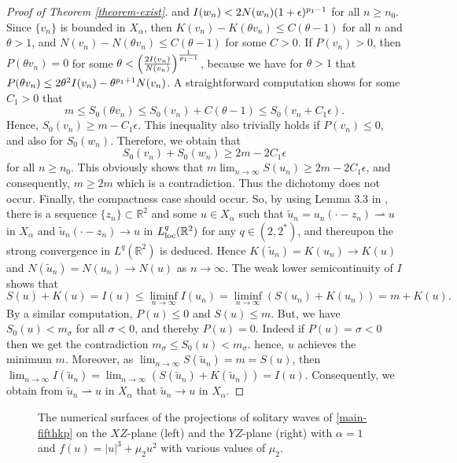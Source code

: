 \documentclass[10pt]{article}
\numberwithin{equation}{section}
\newcommand{\lam}{\lambda}
\newcommand{\al}{\alpha}
\newcommand{\rt}{{\mathbb{R}^2}}
\begin{document}
\begin{proof}[Proof of Theorem \ref{theorem-exist}]
		and $I(w_n)<2N(w_n)(1+\epsilon)^{{p_1}-1}$ for all $n\geq n_0$. Since $\{v_n\}$ is bounded in $X_\al$, then $K(v_n)-K(\theta v_n)\leq C(\theta-1)$ for all $n$ and $\theta>1$, and $N(v_n)-N(\theta v_n)\leq C(\theta-1)$ for some $C>0$. If $P(v_n)>0$, then $P(\theta v_n)=0$ for some $\theta<\left(\frac{2I(v_n)}{N(v_n)}\right)^{\frac1{{p_1}-1}}$, because we have for $\theta>1$ that $P(\theta v_n)\leq2\theta^2I(v_n)-\theta^{{p_1}+1}N(v_n)$. A straightforward computation shows for some $C_1>0$ that
		\[
		m\leq S_0(\theta v_n)
		\leq S_0(v_n)+C(\theta-1)\leq S_0(v_n+C_1\epsilon).
		\]
		Hence, $S_0(v_n)\geq m-C_1\epsilon$. This inequality also trivially holds if $P(v_n)\leq0$, and also for $S_0(w_n)$. Therefore, we obtain that
		\[
		S_0(v_n)+	 S_0(w_n)\geq 2m-2C_1\epsilon
		\]
		for all $n\geq n_0$. This obviously shows that $m\lim_{n\to\infty}S(u_n)\geq 2m-2C_1\epsilon$, and consequently, $m\geq 2m$ which is a contradiction. Thus the dichotomy does not occur. Finally, the compactness case should occur. So, by using Lemma 3.3 in \cite{dbs-1}, there is a sequence $\{z_n\}\subset\rt$ and some $u\in X_\al$ such that $\tilde u_n=u_n(\cdot-z_n)\rightharpoonup u$  in $X_\al$ and  $\tilde u_n(\cdot-z_n)\to u$ in $L^q_{\rm loc}(\rt)$ for any $q\in(2,2^\ast)$, and thereupon the strong convergence in $L^q(\rt)$ is deduced. Hence $K(\tilde u_n)=K(u_n)\to K(u)$  and $N(\tilde  u_n)=N(u_n)\to N(u)$ as $n\to\infty$. The weak lower semicontinuity of $I$ shows that
		\[
		S(u)+K(u)=I(u)\leq \liminf_{n\to\infty}I(u_n)=\liminf_{n\to\infty}(S(u_n)+K(u_n))=m+K(u).
		\]
		By a similar computation, $P(u)\leq0$ and $S(u)\leq m$. But, we have $S_0(u)<m_\sigma$ for all $\sigma<0$, and thereby $P(u)=0$. Indeed if $P(u)=\sigma<0$ then we get the contradiction $m_\sigma\leq S_0(u)<m_\sigma$. hence, $u$ achieves the minimum $m$. Moreover, as $\lim_{n\to\infty}S(\tilde u_n)=m=S(u)$, then $\lim_{n\to\infty} I(\tilde u_n)=\lim_{n\to\infty} (S(\tilde u_n)+K(\tilde u_n))=I(u)$. Consequently, we obtain from $\tilde u_n\rightharpoonup u$ in $X_\al$ that $\tilde u_n\to u$ in $X_\al$.
	\end{proof}
	
	\begin{figure}[ht]
		\begin{center}
			\caption{The numerical surfaces of the projections of solitary waves of  \eqref{main-fifthkp} on the $XZ$-plane (left) and  the $YZ$-plane (right) with $\al=1$ and $f(u)=|u|^3+\mu_2 u^2$ with various values of $\mu_2$. }\label{nume-slt-3} 
	\end{center}\end{figure}
	
\end{document}
